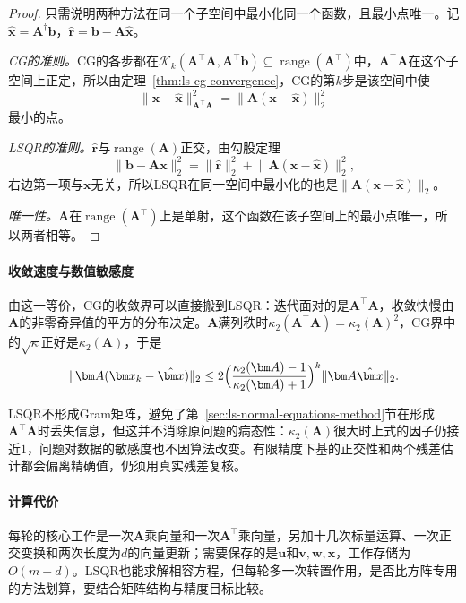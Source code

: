 \begin{proof}
只需说明两种方法在同一个子空间中最小化同一个函数，且最小点唯一。记$\hat{\bm x}=\bm A^\dagger\bm b$，$\hat{\bm r}=\bm b-\bm A\hat{\bm x}$。

\emph{CG的准则。}CG的各步都在$\mathcal K_k(\bm A^\top\bm A,\bm A^\top\bm b)\subseteq\operatorname{range}(\bm A^\top)$中，$\bm A^\top\bm A$在这个子空间上正定，所以由定理~\ref{thm:ls-cg-convergence}，CG的第$k$步是该空间中使
\[
 \lVert\bm x-\hat{\bm x}\rVert_{\bm A^\top\bm A}^2=\lVert\bm A(\bm x-\hat{\bm x})\rVert_2^2
\]
最小的点。

\emph{LSQR的准则。}$\hat{\bm r}$与$\operatorname{range}(\bm A)$正交，由勾股定理
\[
 \lVert\bm b-\bm A\bm x\rVert_2^2=\lVert\hat{\bm r}\rVert_2^2+\lVert\bm A(\bm x-\hat{\bm x})\rVert_2^2 ,
\]
右边第一项与$\bm x$无关，所以LSQR在同一空间中最小化的也是$\lVert\bm A(\bm x-\hat{\bm x})\rVert_2$。

\emph{唯一性。}$\bm A$在$\operatorname{range}(\bm A^\top)$上是单射，这个函数在该子空间上的最小点唯一，所以两者相等。
\end{proof}

\paragraph{收敛速度与数值敏感度}
由这一等价，CG的收敛界可以直接搬到LSQR：迭代面对的是$\bm A^\top\bm A$，收敛快慢由$\bm A$的非零奇异值的平方的分布决定。$\bm A$满列秩时$\kappa_2(\bm A^\top\bm A)=\kappa_2(\bm A)^2$，CG界中的$\sqrt\kappa$正好是$\kappa_2(\bm A)$，于是
\begin{equation}
 \lVert\bm A(\bm x_k-\hat{\bm x})\rVert_2\le2\Bigl(\frac{\kappa_2(\bm A)-1}{\kappa_2(\bm A)+1}\Bigr)^k\lVert\bm A\hat{\bm x}\rVert_2 .
 \label{eq:ls-lsqr-convergence-bound}
\end{equation}

LSQR不形成Gram矩阵，避免了第~\ref{sec:ls-normal-equations-method}节在形成$\bm A^\top\bm A$时丢失信息，但这并不消除原问题的病态性：$\kappa_2(\bm A)$很大时上式的因子仍接近$1$，问题对数据的敏感度也不因算法改变。有限精度下基的正交性和两个残差估计都会偏离精确值，仍须用真实残差复核。

\paragraph{计算代价}
每轮的核心工作是一次$\bm A$乘向量和一次$\bm A^\top$乘向量，另加十几次标量运算、一次正交变换和两次长度为$d$的向量更新；需要保存的是$\bm u$和$\bm v,\bm w,\bm x$，工作存储为$O(m+d)$。LSQR也能求解相容方程，但每轮多一次转置作用，是否比方阵专用的方法划算，要结合矩阵结构与精度目标比较。
